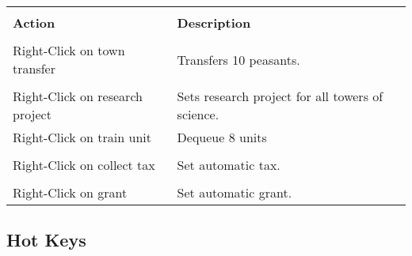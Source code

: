 \begin{tabular}{|p{2in} p{2in}|}
    \hline \\
    \textbf{Action} & \textbf{Description} \\ \\
    \hline    
    Right-Click on town transfer & Transfers 10 peasants. \\ \\
    Right-Click on research project    & Sets research project for all towers of science. \\
    Right-Click    on train unit    & Dequeue 8 units \\ \\
    Right-Click on collect tax    & Set automatic tax. \\ \\
    Right-Click on grant    &  Set automatic grant. \\
    \hline
\end{tabular}

\subsection{\textsf{Hot Keys}}


